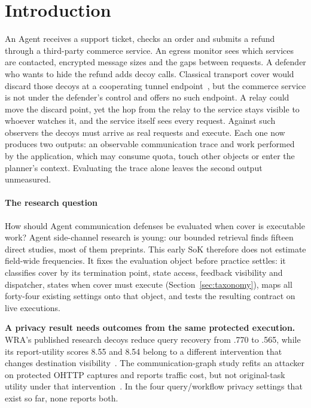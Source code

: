 \section{Introduction}
An Agent receives a support ticket, checks an order and submits a refund through a third-party commerce service. An egress monitor sees which services are contacted, encrypted message sizes and the gaps between requests. A defender who wants to hide the refund adds decoy calls. Classical transport cover would discard those decoys at a cooperating tunnel endpoint~\cite{apthorpe2019stp}, but the commerce service is not under the defender's control and offers no such endpoint. A relay could move the discard point, yet the hop from the relay to the service stays visible to whoever watches it, and the service itself sees every request. Against such observers the decoys must arrive as real requests and execute. Each one now produces two outputs: an observable communication trace and work performed by the application, which may consume quota, touch other objects or enter the planner's context. Evaluating the trace alone leaves the second output unmeasured.



\paragraph{The research question}
How should Agent communication defenses be evaluated when cover is executable work? Agent side-channel research is young: our bounded retrieval finds fifteen direct studies, most of them preprints. This early SoK therefore does not estimate field-wide frequencies. It fixes the evaluation object before practice settles: it classifies cover by its termination point, state access, feedback visibility and dispatcher, states when cover must execute (Section~\ref{sec:taxonomy}), maps all forty-four existing settings onto that object, and tests the resulting contract on live executions.

\textbf{A privacy result needs outcomes from the same protected execution.} WRA's published research decoys reduce query recovery from .770 to .565, while its report-utility scores 8.55 and 8.54 belong to a different intervention that changes destination visibility~\cite{jeong2026wra}. The communication-graph study refits an attacker on protected OHTTP captures and reports traffic cost, but not original-task utility under that intervention~\cite{dangol2026workflow}. In the four query/workflow privacy settings that exist so far, none reports both.

